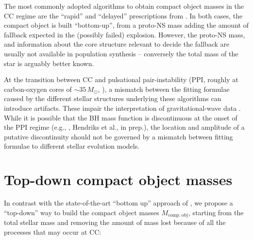 \documentclass[twocolumn]{aastex63}
\newcommand{\todo}[1]{{\large $\blacksquare$~\textbf{\color{red}[#1]}}~$\blacksquare$}
\begin{document}
The most commonly adopted algorithms to obtain compact object masses
in the CC regime are the ``rapid'' and ``delayed''
prescriptions from \cite{fryer:12}. In both cases, the compact object
is built ``bottom-up'', from a proto-NS mass adding the amount of
fallback expected in the (possibly failed) explosion. However, the
proto-NS mass, and information about the core structure relevant
to decide the fallback are usually not available in population
synthesis \citep[e.g.,][]{patton:20} -- conversely the total mass of
the star is arguably better known. %

At the transition between CC and pulsational pair-instability (PPI,
roughly at carbon-oxygen cores of $\sim{}35\,M_\odot$,
\citealt{woosley:17, marchant:19, renzo:20csm, costa:21}), a mismatch
between the fitting formulae caused by the different stellar
structures underlying these algorithms can introduce artifacts. These
impair the interpretation of gravitational-wave data \citep[as pointed
out in Fig.~5 of][]{vanson:21}. While it is possible that the BH mass
function is discontinuous at the onset of the PPI regime (e.g.,
\citealt{renzo:20conv,costa:21}, Hendriks et al., in prep.), the
location and amplitude of a putative discontinuity should not be
governed by a mismatch between fitting formulae to different stellar
evolution models.

\section{Top-down compact object masses}

In contrast with the state-of-the-art  ``bottom up'' approach of
\cite{fryer:12}, we propose a ``top-down'' way to build the compact object masses
$M_\mathrm{comp.\ obj}$, starting from the total stellar mass and
removing the amount of mass lost because of all the processes that may
occur at CC:

\end{document}
